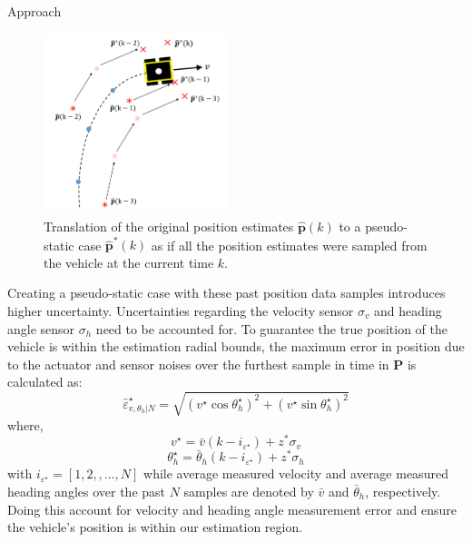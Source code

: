 \begin{section}{Approach}
\begin{figure}[ht!]
\vspace{1pt}
\centering
\includegraphics[width=0.48\textwidth]{pseudo_static.png}
\caption{Translation of the original position estimates $\hat{\bm{p}}(k)$ to a pseudo-static case $\hat{\bm{p}}^*(k)$ as if all the position estimates were sampled from the vehicle at the current time $k$.}
\label{fig:pseudo_static}
\end{figure}

Creating a pseudo-static case with these past position data samples introduces higher uncertainty. Uncertainties regarding the velocity sensor $\sigma_v$ and heading angle sensor $\sigma_h$ need to be accounted for. To guarantee the true position of the vehicle is within the estimation radial bounds, the maximum error in position due to the actuator and sensor noises over the furthest sample in time in $\bm{P}$ is calculated as:
    \begin{equation}
	\hat{\varepsilon}_{v,\theta_h|N}^{\star}=\sqrt{(v^{\star}\cos{\theta_h^{\star}})^2+(v^{\star}\sin{\theta_h^{\star}})^2}
	\end{equation}
where,
    \begin{equation}
	v^{\star}=\bar{v}(k-i_{\varepsilon^{\star}})+z^{*}\sigma_v \nonumber
	\end{equation}
	\begin{equation}
	\theta_h^{\star}=\bar{\theta}_h(k-i_{\varepsilon^{\star}})+z^{*}\sigma_h \nonumber
	\end{equation}
with $i_{\varepsilon^{\star}}=[1,2,,\dots,N]$ while average measured velocity and average measured heading angles over the past $N$ samples are denoted by $\bar{v}$ and $\bar{\theta}_h$, respectively. Doing this account for velocity and heading angle measurement error and ensure the vehicle's position is within our estimation region.



\end{section}
